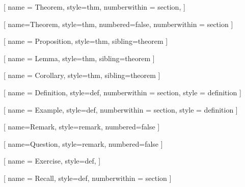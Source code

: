 \newcommand{\plainheadertext}{%
    \if\relax\detokenize\expandafter{\currentparttitle}\relax
        \currentchaptertitle
    \else
        \currentparttitle
    \fi
}

\fancypagestyle{plain}{%
    \fancyhf{}
    \cfoot{\scriptsize\thepage}
    \fancyhead[L]{\scalebox{0.8}{\nouppercase{\plainheadertext}}}
    \fancyhead[R]{\scalebox{0.8}{\projecttitle}}
    \renewcommand{\headrulewidth}{0.4pt}
}



\usepackage{keytheorems}



[
    	name = Theorem,
    	style=thm,
    	numberwithin = section,
]

[
    	name=Theorem,
    	style=thm,
    	numbered=false,
    	numberwithin = section
]

[
    	name = Proposition,
    	style=thm,
    	sibling=theorem
]

[
    	name = Lemma,
    	style=thm,
    	sibling=theorem
]

[
    	name = Corollary,
    	style=thm,
    	sibling=theorem
]

[
    	name = Definition,
    	style=def,
    	numberwithin = section,
    	style = definition
]

[
    	name = Example,
    	style=def,
    	numberwithin = section,
    	style = definition
]

[
    	name=Remark,
    	style=remark,
    	numbered=false
]

[
    	name=Question,
    	style=remark,
    	numbered=false
]

[
    	name = Exercise,
    	style=def,
]

[
	name = Recall,
	style=def,
	numberwithin = section
]


